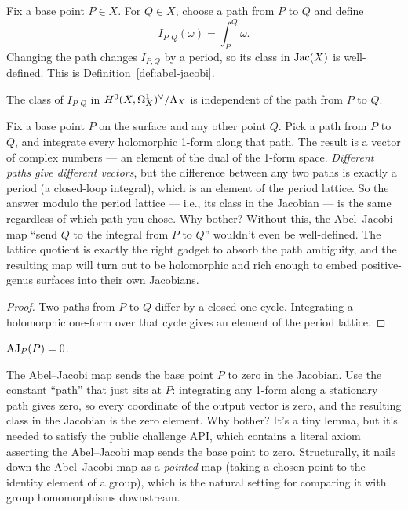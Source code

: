 Fix a base point \(P\in X\). For \(Q\in X\), choose a path from \(P\) to \(Q\)
and define
\[
  I_{P,Q}(\omega)=\int_P^Q\omega.
\]
Changing the path changes \(I_{P,Q}\) by a period, so its class in
\(\operatorname{Jac}(X)\) is well-defined. This is Definition~\ref{def:abel-jacobi}.

\begin{lemma}
\label{lem:aj-path-independence}
The class of \(I_{P,Q}\) in \(H^{0}(X,\Omega^{1}_{X})^{\vee}/\Lambda_X\) is independent of the path
from \(P\) to \(Q\).
\leanok
\end{lemma}

\begin{layman}
Fix a base point \(P\) on the surface and any other point \(Q\). Pick a
path from \(P\) to \(Q\), and integrate every holomorphic 1-form along
that path. The result is a vector of complex numbers --- an element of
the dual of the 1-form space. \emph{Different paths give different
vectors}, but the difference between any two paths is exactly a
period (a closed-loop integral), which is an element of the period
lattice. So the answer modulo the period lattice --- i.e., its class in
the Jacobian --- is the same regardless of which path you chose. Why
bother? Without this, the Abel--Jacobi map ``send \(Q\) to the integral
from \(P\) to \(Q\)'' wouldn't even be well-defined. The lattice
quotient is exactly the right gadget to absorb the path ambiguity, and
the resulting map will turn out to be holomorphic and rich enough to
embed positive-genus surfaces into their own Jacobians.
\end{layman}

\begin{proof}
\leanok
Two paths from \(P\) to \(Q\) differ by a closed one-cycle. Integrating a
holomorphic one-form over that cycle gives an element of the period lattice.
\end{proof}

\begin{lemma}
\label{lem:aj-self}
\(\operatorname{AJ}_P(P)=0\).
\leanok
\end{lemma}

\begin{layman}
The Abel--Jacobi map sends the base point \(P\) to zero in the Jacobian.
Use the constant ``path'' that just sits at \(P\): integrating any
1-form along a stationary path gives zero, so every coordinate of the
output vector is zero, and the resulting class in the Jacobian is the
zero element. Why bother? It's a tiny lemma, but it's needed to satisfy
the public challenge API, which contains a literal axiom asserting the
Abel--Jacobi map sends the base point to zero. Structurally, it nails
down the Abel--Jacobi map as a \emph{pointed} map (taking a chosen
point to the identity element of a group), which is the natural setting
for comparing it with group homomorphisms downstream.
\end{layman}

